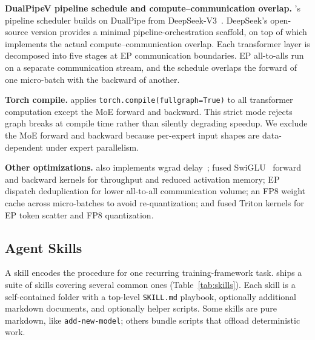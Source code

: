 \squishlist
\item \textbf{DualPipeV pipeline schedule and compute--communication overlap.}
\sys's pipeline scheduler builds on DualPipe from
DeepSeek-V3~\cite{deepseekai2025deepseekv3technicalreport}. DeepSeek's
open-source version provides a minimal pipeline-orchestration
scaffold, on top of which \sys implements the actual
compute--communication overlap. Each transformer layer is
decomposed into five stages at EP communication boundaries. EP
all-to-alls run on a separate communication stream, and the schedule
overlaps the forward of one micro-batch with the backward of another.

\vspace{-2pt}

\item \textbf{Torch compile.}
\sys applies \texttt{torch.compile(fullgraph=True)} to all
transformer computation except the MoE forward and backward. This
strict mode rejects graph breaks at compile time rather than
silently degrading speedup. We exclude the MoE forward and
backward because per-expert input shapes are data-dependent under
expert parallelism.

\vspace{-2pt}

\item \textbf{Other optimizations.}
\sys also implements
wgrad delay~\cite{qi2024zero}; fused SwiGLU~\cite{shazeer2020gluvariantsimprovetransformer} forward and
backward kernels for throughput and reduced activation memory; EP
dispatch deduplication for lower all-to-all communication volume;
an FP8 weight cache across micro-batches to avoid re-quantization;
and fused Triton kernels for EP token scatter and FP8 quantization.
\squishend


\subsection{Agent Skills}
\label{sec:pithtrain:skills}

A skill encodes the procedure for one recurring training-framework
task. \sys ships a suite of skills covering several common ones
(Table~\ref{tab:skills}). Each skill is a self-contained folder with
a top-level \texttt{SKILL.md} playbook, optionally additional markdown
documents, and optionally helper scripts. Some skills are pure
markdown, like \texttt{add-new-model}; others bundle scripts that
offload deterministic work.

